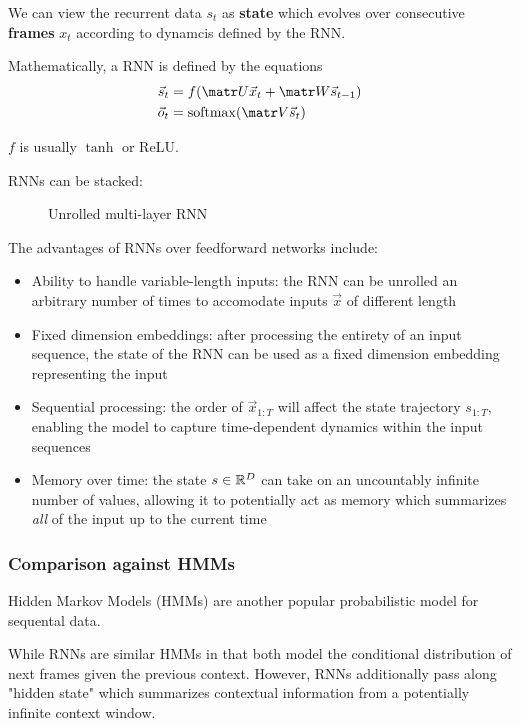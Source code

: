We can view the recurrent data $s_t$ as \textbf{state} which evolves
over consecutive \textbf{frames} $x_t$ according to dynamcis defined
by the RNN.

Mathematically, a RNN is defined by the equations
\begin{align}
    \s_t &= f(\U \x_t + \W \s_{t-1}) \\
    \o_t &= \softmax( \V \s_t)
\end{align}

$f$ is usually $\tanh$ or ReLU.

RNNs can be stacked:

\begin{figure}[htpb]
    \centering
    \caption{Unrolled multi-layer RNN}
    \label{fig:rnn-multi-unrolled}
\end{figure}


The advantages of RNNs over feedforward networks include:
\begin{itemize}
    \item Ability to handle variable-length inputs: the RNN can be unrolled an arbitrary
        number of times to accomodate inputs $\vec{x}$ of different length
    \item Fixed dimension embeddings: after processing the entirety of an input
        sequence, the state of the RNN can be used as a fixed dimension embedding
        representing the input
    \item Sequential processing: the order of $\vec{x}_{1:T}$ will affect the state
        trajectory $s_{1:T}$, enabling the model to capture time-dependent dynamics
        within the input sequences
    \item Memory over time: the state $s \in \mathbb{R}^D$ can take on an uncountably infinite
        number of values, allowing it to potentially act as memory which summarizes
        \emph{all} of the input up to the current time
\end{itemize}

\subsubsection{Comparison against HMMs}

Hidden Markov Models (HMMs) are another popular probabilistic model for
sequental data. 

While RNNs are similar HMMs in that both model the conditional distribution of
next frames given the previous context. However, RNNs additionally pass along
"hidden state" which summarizes contextual information from a potentially
infinite context window.

